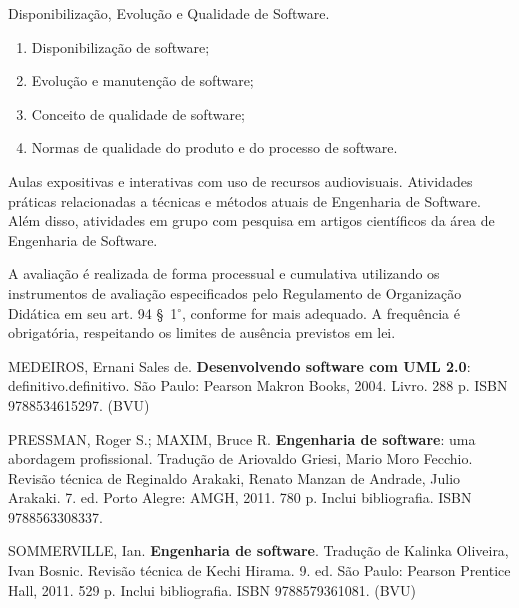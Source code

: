 \begin{pud}
\begin{description}[itemsep=0em]
         \item[UNIDADE VI:]  Disponibilização, Evolução e Qualidade de Software.
	         \begin{enumerate}[itemsep=0em, topsep=0em]
				\item Disponibilização de software;
				\item Evolução e manutenção de software;
				\item Conceito de qualidade de software;
				\item Normas de qualidade do produto e do processo de software.  
            \end{enumerate}
	\end{description}
	
	\metodologia
	Aulas expositivas e interativas com uso de recursos audiovisuais. Atividades práticas relacionadas a técnicas e métodos atuais de Engenharia de Software. Além disso, atividades em grupo com pesquisa em artigos científicos da área de Engenharia de Software.
	
	\avaliacao
	A avaliação é realizada de forma processual e cumulativa utilizando os instrumentos de avaliação especificados pelo Regulamento de Organização Didática em seu art. 94 \S~1$^\circ$, conforme for mais adequado. A frequência é obrigatória, respeitando os limites de ausência previstos em lei.
	
	\begin{bibbasica}
			
 		\item MEDEIROS, Ernani Sales de. \textbf{Desenvolvendo software com UML 2.0}: definitivo.definitivo. São Paulo:  Pearson Makron Books, 2004. Livro. 288 p. ISBN 9788534615297. (BVU) 
		
 		\item PRESSMAN, Roger S.; MAXIM, Bruce R. \textbf{Engenharia de software}: uma abordagem profissional.  Tradução de Ariovaldo Griesi, Mario Moro Fecchio. Revisão técnica de Reginaldo Arakaki, Renato Manzan de Andrade, Julio Arakaki. 7. ed. Porto Alegre: AMGH, 2011. 780 p. Inclui bibliografia. ISBN 9788563308337. 
 		\item SOMMERVILLE, Ian. \textbf{Engenharia de software}. Tradução de Kalinka Oliveira, Ivan Bosnic. Revisão técnica de Kechi Hirama. 9. ed. São Paulo: Pearson Prentice Hall, 2011. 529 p. Inclui bibliografia. ISBN 9788579361081. (BVU)
 		

\end{bibbasica}
\end{pud}
